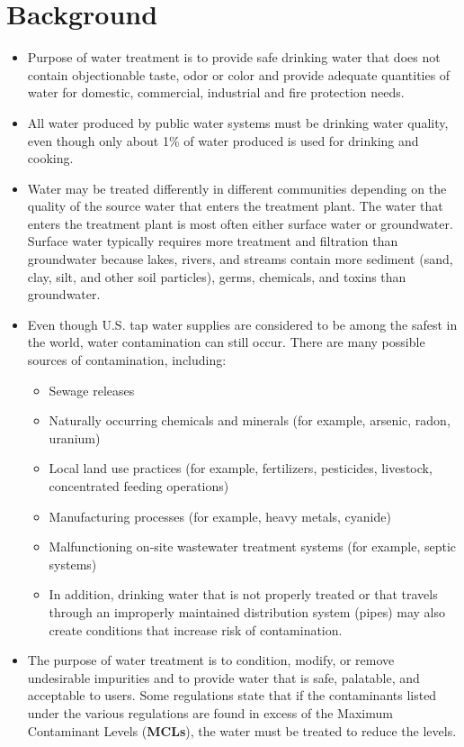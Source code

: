 \section{Background}
\begin{itemize}
\item Purpose of water treatment is to provide safe drinking water that does not contain objectionable taste, odor or color and provide adequate quantities of water for domestic, commercial, industrial and fire protection needs.

\item All water produced by public water systems must be drinking water quality, even though only about 1\% of water produced is used for drinking and cooking.


\item Water may be treated differently in different communities depending on the quality of the source water that enters the treatment plant. The water that enters the treatment plant is most often either surface water or groundwater. Surface water typically requires more treatment and filtration than groundwater because lakes, rivers, and streams contain more sediment (sand, clay, silt, and other soil particles), germs, chemicals, and toxins than groundwater.

\item Even though U.S. tap water supplies are considered to be among the safest in the world, water contamination can still occur. There are many possible sources of contamination, including:
\begin{itemize}
\item Sewage releases
\item Naturally occurring chemicals and minerals (for example, arsenic, radon, uranium)
\item Local land use practices (for example, fertilizers, pesticides, livestock, concentrated feeding operations)
\item Manufacturing processes (for example, heavy metals, cyanide)
\item Malfunctioning on-site wastewater treatment systems (for example, septic systems)
\item In addition, drinking water that is not properly treated or that travels through an improperly maintained distribution system (pipes) may also create conditions that increase risk of contamination.
\end{itemize}

\item The purpose of water treatment is to condition, modify, or remove undesirable impurities and to provide water that is safe, palatable, and acceptable to users. Some regulations state that if the contaminants listed under the various regulations are found in excess of the Maximum Contaminant Levels (\textbf{MCLs}), the water must be treated to reduce the levels. 


\end{itemize}
